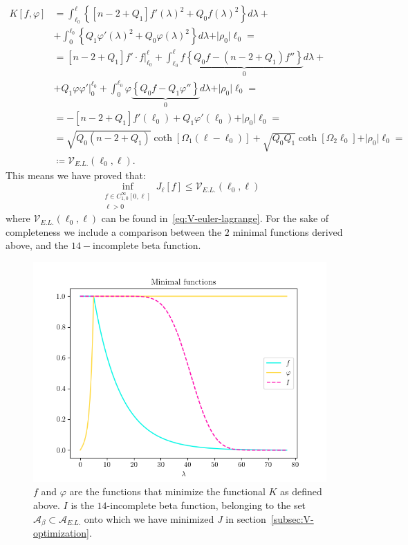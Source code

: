 \begin{align*}
    K[f, \varphi] &= \int_{\ell_0}^{\ell}\left\{\left[n - 2 + Q_1\right] f'(\lambda)^2  + Q_0 f(\lambda)^2\right\}d\lambda + \\
    &+\int_{0}^{\ell_0}\left\{Q_1 \varphi'(\lambda)^2  + Q_0 \varphi(\lambda)^2\right\}d\lambda + \vert\rho_0\vert\ell_0 = \\
    &= \left[n - 2 + Q_1\right] f'\cdot f\Big\vert_{\ell_0}^{\ell} + \int_{\ell_0}^{\ell} f\underbrace{\left\{Q_0f - \left(n - 2 + Q_1\right)f''\right\}}_{0} d\lambda + \\ &+ Q_1\varphi\varphi'\Big\vert_0^{\ell_0} + \int_{0}^{\ell_0} \varphi\underbrace{\left\{Q_0f -  Q_1\varphi''\right\}}_{0} d\lambda + \vert\rho_0\vert\ell_0 =\\
    &=-\left[n - 2 + Q_1\right] f'(\ell_0) +Q_1\varphi'(\ell_0) + \vert\rho_0\vert\ell_0 = \\
    &= \sqrt{Q_0(n - 2 + Q_1)}\coth\left[\Omega_1(\ell- \ell_0)\right] + \sqrt{Q_0Q_1}\coth\left[\Omega_2\ell_0\right] + \vert \rho_0\vert\ell_0 = \\
    &\coloneqq \mathcal{V}_{E.L.}(\ell_0, \ell).
\end{align*}
This means we have proved that:
\[
    \inf_{\substack{f\in C^{\infty}_{1,0}[0, \ell]\\ \ell > 0}}J_{\ell}[f] \le \mathcal{V}_{E.L.}(\ell_0, \ell)
\]
where \(\mathcal{V}_{E.L.}(\ell_0, \ell)\) can be found in~\eqref{eq:V-euler-lagrange}. 
For the sake of completeness we include a comparison between the \(2\) minimal functions derived above, and the \(14-\)incomplete beta function.
\begin{figure}
    \includegraphics[scale=0.9]{Immagini/minimal-functions.png}
    \caption[]{\(f\) and \(\varphi\) are the functions that minimize the functional \(K\) as defined above. \(I\) is the \(14\)-incomplete beta function, belonging to the set \(\mathcal{A}_{\beta} \subset \mathcal{A}_{E.L.}\) onto which we have minimized \(J\) in section~\ref{subsec:V-optimization}.}
\end{figure}